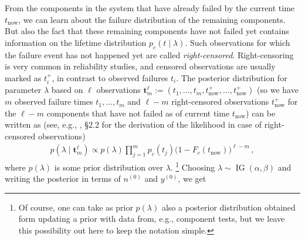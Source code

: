 \documentclass[12pt,a4paper,twocolumn,fleqn]{narms}
\renewcommand{\vec}[1]{{\bm#1}}
\newcommand{\uz}{^{(0)}} %
\newcommand{\ig}{\operatorname{IG}}   %
\def\yz{y\uz}
\def\nz{n\uz}
\begin{document}
From the components in the system that have already failed by the current time $t_\text{now}$,
we can learn about the failure distribution of the remaining components.
But also the fact that these remaining components have not failed yet
contains information on the lifetime distribution $p_c(t\mid \lambda)$.
Such observations for which the failure event has not happened yet are called \emph{right-censored}.
Right-censoring is very common in reliability studies,
and censored observations are usually marked as $t_i^+$, in contrast to observed failures $t_i$.
The posterior distribution for parameter $\lambda$
based on $\ell$ observations $\vec{t}_m^\ell := (t_1,\ldots,t_m,t^+_\text{now},\ldots,t^+_\text{now})$
(so we have $m$ observed failure times $t_1,\ldots,t_m$
and $\ell-m$ right-censored observations $t^+_\text{now}$
for the $\ell-m$ components that have not failed as of current time $t_\text{now}$)
can be written as (see, e.g., , \S 2.2 for the derivation of the likelihood in case of right-censored observations)
\begin{align}
p(\lambda \mid \vec{t}_m^\ell) \propto p(\lambda) \prod_{j=1}^m p_c(t_j) \big(1-F_c(t_\text{now})\big)^{\ell-m}\,,
\end{align}
where $p(\lambda)$ is some prior distribution over $\lambda$.%
\footnote{Of course, one can take as prior $p(\lambda)$ also a posterior distribution
obtained form updating a prior with data from, e.g., component tests,
but we leave this possibility out here to keep the notation simple.}
%
Choosing $\lambda \sim \ig(\alpha,\beta)$ and writing the posterior in terms of $\nz$ and $\yz$, we get
\end{document}
